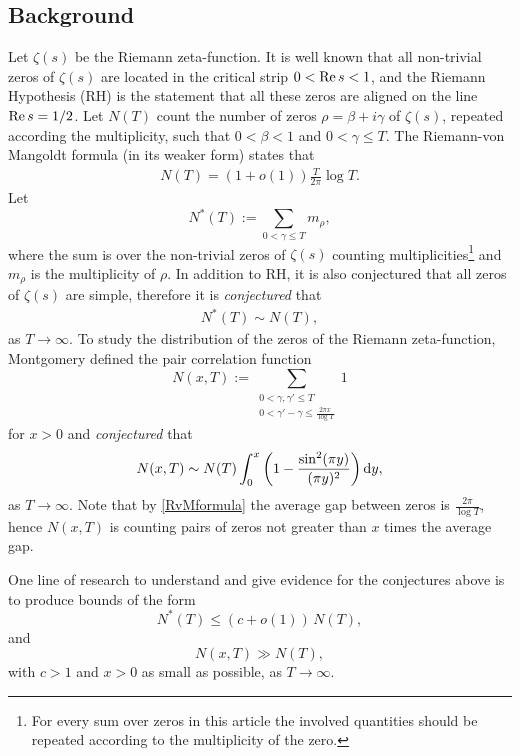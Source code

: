 \documentclass[reqno]{amsart}
\newcommand{\re}{{\rm Re}\,}
\newcommand{\ga}{\gamma}
\renewcommand{\d}{\,\text{\rm d}}
\begin{document}
\subsection{Background} Let $\zeta(s)$ be the Riemann zeta-function. It is well known that all non-trivial zeros of $\zeta(s)$ are located in the critical strip $0<\re s<1$, and the Riemann Hypothesis (RH) is the statement that all these zeros are aligned on the line $\re s=1/2$. Let $N(T)$ count the number of zeros $\rho = \beta + i \gamma$ of $\zeta(s)$, repeated according the multiplicity, such that $0<\beta<1$ and $0 <\gamma \leq T$. The Riemann-von Mangoldt formula (in its weaker form) states that
\begin{align}\label{RvMformula}
N(T) =  (1+o(1)) \frac{T}{2\pi} \log T.
\end{align}
Let
\[
N^{*}(T):=\displaystyle\sum_{0<\gamma\leq T}m_{\rho},
\]
where the sum is over the non-trivial zeros of $\zeta(s)$ counting multiplicities\footnote{For every sum over zeros in this article the involved quantities should be repeated according to the multiplicity of the zero.} and $m_\rho$ is the multiplicity of $\rho$. In addition to RH, it is also conjectured that all zeros of $\zeta(s)$ are simple, therefore it is {\it conjectured} that
\begin{align} \label{NstarNconjecure}
N^{*}(T) \sim N(T),
\end{align}
as $T\to\infty$. To study the distribution of the zeros of the Riemann zeta-function, Montgomery defined the pair correlation function
\begin{equation}\label{paircorrelfunction}
N(x,T):=\sum_{\substack{0< \ga,\ga'\leq T \\ 0<\ga'-\ga\leq \frac{2\pi x}{\log T}}} 1
\end{equation}
for $x > 0$ and {\it conjectured} that
\[N(x,T) \sim N(T)\int_0^x \bigg(1-\frac{\sin^2(\pi y)}{(\pi y)^2}\bigg)\d y,
\]
as $T \to \infty$. Note that by \eqref{RvMformula} the average gap between zeros is $\frac{2\pi}{\log T}$, hence $N(x,T)$ is counting pairs of zeros not greater than $x$ times the average gap.

One line of research to understand and give evidence for the conjectures above is to produce bounds of the form
\begin{equation}\label{prob1}
N^*(T) \leq (c + o(1)) \, N(T),
\end{equation}
and
\begin{equation}\label{prob2}
N(x,T) \gg N(T),
\end{equation}
with $c > 1$ and $x>0$ as small as possible, as $T\to\infty$. 
\end{document}
